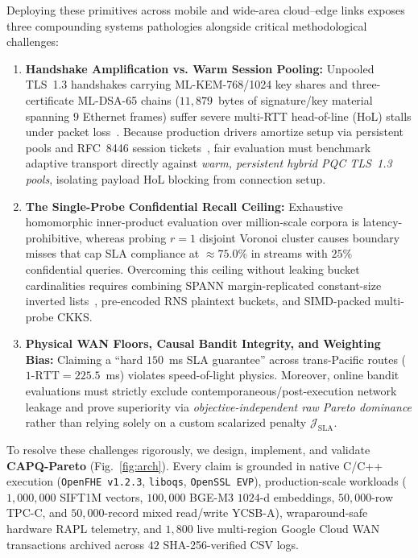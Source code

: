 \documentclass[10pt,journal,compsoc]{IEEEtran}
\begin{document}
Deploying these primitives across mobile and wide-area cloud--edge links exposes three compounding systems pathologies alongside critical methodological challenges:
\begin{enumerate}
    \item \textbf{Handshake Amplification vs. Warm Session Pooling:} Unpooled TLS~1.3 handshakes carrying ML-KEM-768/1024 key shares and three-certificate ML-DSA-65 chains ($11,879$~bytes of signature/key material spanning $9$ Ethernet frames) suffer severe multi-RTT head-of-line (HoL) stalls under packet loss~\cite{paquin2020pqctls,sosnowski2023pqckem}. Because production drivers amortize setup via persistent pools and RFC~8446 session tickets~\cite{rfc8446_tls13}, fair evaluation must benchmark adaptive transport directly against \emph{warm, persistent hybrid PQC TLS~1.3 pools}, isolating payload HoL blocking from connection setup.
    \item \textbf{The Single-Probe Confidential Recall Ceiling:} Exhaustive homomorphic inner-product evaluation over million-scale corpora is latency-prohibitive, whereas probing $r=1$ disjoint Voronoi cluster causes boundary misses that cap SLA compliance at $\approx 75.0\%$ in streams with $25\%$ confidential queries. Overcoming this ceiling without leaking bucket cardinalities requires combining SPANN margin-replicated constant-size inverted lists~\cite{chen2021spann}, pre-encoded RNS plaintext buckets, and SIMD-packed multi-probe CKKS.
    \item \textbf{Physical WAN Floors, Causal Bandit Integrity, and Weighting Bias:} Claiming a ``hard $150$~ms SLA guarantee'' across trans-Pacific routes ($\text{1-RTT} = 225.5$~ms) violates speed-of-light physics. Moreover, online bandit evaluations must strictly exclude contemporaneous/post-execution network leakage and prove superiority via \emph{objective-independent raw Pareto dominance} rather than relying solely on a custom scalarized penalty $\mathcal{J}_{\mathrm{SLA}}$.
\end{enumerate}

To resolve these challenges rigorously, we design, implement, and validate \textbf{CAPQ-Pareto} (Fig.~\ref{fig:arch}). Every claim is grounded in native C/C++ execution (\texttt{OpenFHE v1.2.3}, \texttt{liboqs}, \texttt{OpenSSL EVP}), production-scale workloads ($1,000,000$ SIFT1M vectors, $100,000$ BGE-M3 $1024$-d embeddings, $50,000$-row TPC-C, and $50,000$-record mixed read/write YCSB-A), wraparound-safe hardware RAPL telemetry, and $1,800$ live multi-region Google Cloud WAN transactions archived across $42$ SHA-256-verified CSV logs.
\end{document}
